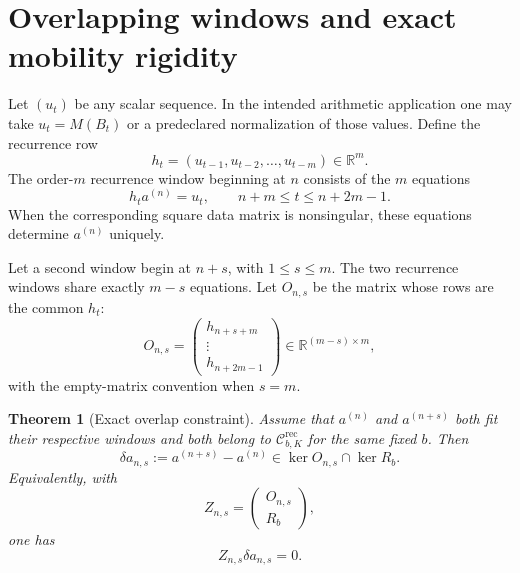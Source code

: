 \documentclass[11pt]{amsart}
\numberwithin{equation}{section}
\theoremstyle{plain}
\newtheorem{theorem}{Theorem}[section]
\theoremstyle{definition}
\theoremstyle{remark}
\begin{document}
\section{Overlapping windows and exact mobility rigidity}
\label{sec:overlap_rigidity}

Let $(u_t)$ be any scalar sequence.  In the intended arithmetic application one may take $u_t=M(B_t)$ or a predeclared normalization of those values.  Define the recurrence row
\begin{equation}
h_t=(u_{t-1},u_{t-2},\ldots,u_{t-m})\in\mathbb R^m.
\label{eq:recurrence_row}
\end{equation}
The order-$m$ recurrence window beginning at $n$ consists of the $m$ equations
\begin{equation}
h_ta^{(n)}=u_t,
\qquad
n+m\leq t\leq n+2m-1.
\label{eq:window_recurrence_equations}
\end{equation}
When the corresponding square data matrix is nonsingular, these equations determine $a^{(n)}$ uniquely.

Let a second window begin at $n+s$, with $1\leq s\leq m$.  The two recurrence windows share exactly $m-s$ equations.  Let $O_{n,s}$ be the matrix whose rows are the common $h_t$:
\begin{equation}
O_{n,s}
=
\begin{pmatrix}
h_{n+s+m}\\
\vdots\\
h_{n+2m-1}
\end{pmatrix}
\in\mathbb R^{(m-s)\times m},
\label{eq:overlap_matrix}
\end{equation}
with the empty-matrix convention when $s=m$.

\begin{theorem}[Exact overlap constraint]
\label{thm:exact_overlap_constraint}
Assume that $a^{(n)}$ and $a^{(n+s)}$ both fit their respective windows and both belong to $\mathcal C^{\mathrm{rec}}_{b,K}$ for the same fixed $b$.  Then
\begin{equation}
\delta a_{n,s}:=a^{(n+s)}-a^{(n)}
\in
\ker O_{n,s}\cap\ker R_b.
\label{eq:overlap_kernel_intersection}
\end{equation}
Equivalently, with
\begin{equation}
Z_{n,s}
=
\begin{pmatrix}
O_{n,s}\\
R_b
\end{pmatrix},
\label{eq:stacked_overlap_matrix}
\end{equation}
one has
\begin{equation}
Z_{n,s}\delta a_{n,s}=0.
\label{eq:stacked_overlap_null}
\end{equation}
\end{theorem}
\end{document}
